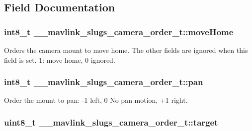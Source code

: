 \subsection{Field Documentation}
\hypertarget{struct____mavlink__slugs__camera__order__t_a9db8eda6aa3a156119774511f3046d86}{
\subsubsection[{move\+Home}]{\setlength{\rightskip}{0pt plus 5cm}int8\+\_\+t \+\_\+\+\_\+mavlink\+\_\+slugs\+\_\+camera\+\_\+order\+\_\+t\+::move\+Home}}\label{struct____mavlink__slugs__camera__order__t_a9db8eda6aa3a156119774511f3046d86}


Orders the camera mount to move home. The other fields are ignored when this field is set. 1\+: move home, 0 ignored. 

\hypertarget{struct____mavlink__slugs__camera__order__t_ad69717ecdb9bbbb45ddf47b755b23b4f}{
\subsubsection[{pan}]{\setlength{\rightskip}{0pt plus 5cm}int8\+\_\+t \+\_\+\+\_\+mavlink\+\_\+slugs\+\_\+camera\+\_\+order\+\_\+t\+::pan}}\label{struct____mavlink__slugs__camera__order__t_ad69717ecdb9bbbb45ddf47b755b23b4f}


Order the mount to pan\+: -\/1 left, 0 No pan motion, +1 right. 

\hypertarget{struct____mavlink__slugs__camera__order__t_afc44268177e500935e03dc91679f33a3}{
\subsubsection[{target}]{\setlength{\rightskip}{0pt plus 5cm}uint8\+\_\+t \+\_\+\+\_\+mavlink\+\_\+slugs\+\_\+camera\+\_\+order\+\_\+t\+::target}}\label{struct____mavlink__slugs__camera__order__t_afc44268177e500935e03dc91679f33a3}


